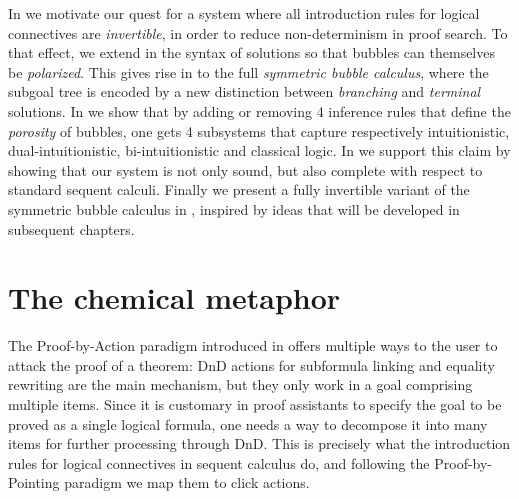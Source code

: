 In  we motivate our quest for a system where all
introduction rules for logical connectives are \emph{invertible}, in order to
reduce non-determinism in proof search. To that effect, we extend in
 the syntax of solutions so that bubbles can themselves be
\emph{polarized}. This gives rise in  to the full
\emph{symmetric bubble calculus}, where the subgoal tree is encoded by a new
distinction between \emph{branching} and \emph{terminal} solutions. In
 we show that by adding or removing 4 inference rules
that define the \emph{porosity} of bubbles, one gets 4 subsystems that capture
respectively intuitionistic, dual-intuitionistic, bi-intuitionistic and
classical logic. In  we support this claim by
showing that our system is not only sound, but also complete with respect to
standard sequent calculi. Finally we present a fully invertible variant of the
symmetric bubble calculus in , inspired by ideas
that will be developed in subsequent chapters.


\section{The chemical metaphor}

The Proof-by-Action paradigm introduced in  offers multiple ways to
the user to attack the proof of a theorem: DnD actions for subformula linking
and equality rewriting are the main mechanism, but they only work in a goal
comprising multiple items. Since it is customary in proof assistants to specify
the goal to be proved as a single logical formula, one needs a way to decompose
it into many items for further processing through DnD. This is precisely what
the introduction rules for logical connectives in sequent calculus do, and
following the Proof-by-Pointing paradigm \cite{PbP} we map them to click
actions.

